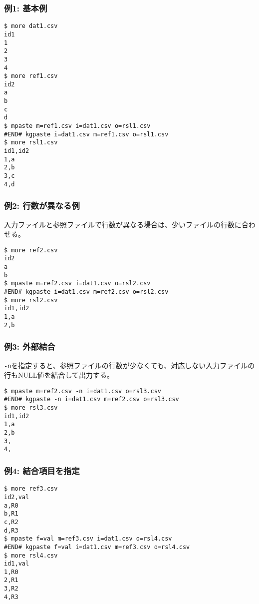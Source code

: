 \subsubsection*{例1: 基本例}



\begin{Verbatim}[baselinestretch=0.7,frame=single]
$ more dat1.csv
id1
1
2
3
4
$ more ref1.csv
id2
a
b
c
d
$ mpaste m=ref1.csv i=dat1.csv o=rsl1.csv
#END# kgpaste i=dat1.csv m=ref1.csv o=rsl1.csv
$ more rsl1.csv
id1,id2
1,a
2,b
3,c
4,d
\end{Verbatim}
\subsubsection*{例2: 行数が異なる例}

入力ファイルと参照ファイルで行数が異なる場合は、少いファイルの行数に合わせる。


\begin{Verbatim}[baselinestretch=0.7,frame=single]
$ more ref2.csv
id2
a
b
$ mpaste m=ref2.csv i=dat1.csv o=rsl2.csv
#END# kgpaste i=dat1.csv m=ref2.csv o=rsl2.csv
$ more rsl2.csv
id1,id2
1,a
2,b
\end{Verbatim}
\subsubsection*{例3: 外部結合}

\verb|-n|を指定すると、参照ファイルの行数が少なくても、対応しない入力ファイルの行もNULL値を結合して出力する。


\begin{Verbatim}[baselinestretch=0.7,frame=single]
$ mpaste m=ref2.csv -n i=dat1.csv o=rsl3.csv
#END# kgpaste -n i=dat1.csv m=ref2.csv o=rsl3.csv
$ more rsl3.csv
id1,id2
1,a
2,b
3,
4,
\end{Verbatim}
\subsubsection*{例4: 結合項目を指定}



\begin{Verbatim}[baselinestretch=0.7,frame=single]
$ more ref3.csv
id2,val
a,R0
b,R1
c,R2
d,R3
$ mpaste f=val m=ref3.csv i=dat1.csv o=rsl4.csv
#END# kgpaste f=val i=dat1.csv m=ref3.csv o=rsl4.csv
$ more rsl4.csv
id1,val
1,R0
2,R1
3,R2
4,R3
\end{Verbatim}
